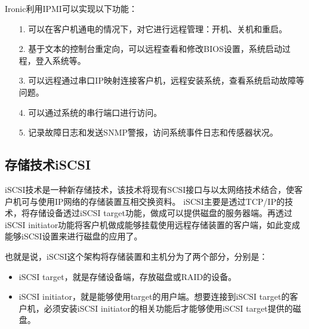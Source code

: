 \documentclass[a4paper,left=2.5cm,right=2.5cm,11pt]{article}
\begin{document}
	Ironic利用IPMI可以实现以下功能：
	\begin{itemize}
		\item[1.] 可以在客户机通电的情况下，对它进行远程管理：开机、关机和重启。
		\item[2.] 基于文本的控制台重定向，可以远程查看和修改BIOS设置，系统启动过程，登入系统等。
		\item[3.] 可以远程通过串口IP映射连接客户机，远程安装系统，查看系统启动故障等问题。
		\item[4.] 可以通过系统的串行端口进行访问。
		\item[5.] 记录故障日志和发送SNMP警报，访问系统事件日志和传感器状况。
	\end{itemize}

\subsection{存储技术iSCSI}
	iSCSI技术是一种新存储技术，该技术将现有SCSI接口与以太网络技术结合，使客户机可与使用IP网络的存储装置互相交换资料。
	iSCSI主要是透过TCP/IP的技术，将存储设备透过iSCSI target功能，做成可以提供磁盘的服务器端。再透过iSCSI initiator功能将客户机做成能够挂载使用远程存储装置的客户端，如此变成能够iSCSI设置来进行磁盘的应用了。\par

	也就是说，iSCSI这个架构将存储装置和主机分为了两个部分，分别是：
	\begin{itemize}
		\item iSCSI target，就是存储设备端，存放磁盘或RAID的设备。
		\item iSCSI initiator，就是能够使用target的用户端。想要连接到iSCSI target的客户机，必须安装iSCSI initiator的相关功能后才能够使用iSCSI target提供的磁盘。
	\end{itemize}
\end{document}
